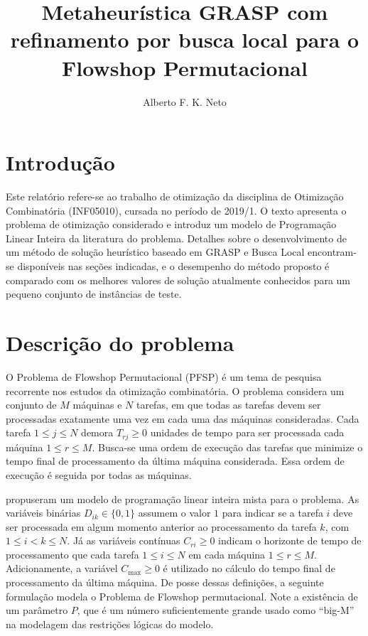\documentclass[12pt]{article}
\title{Metaheurística GRASP com refinamento por busca local para o Flowshop Permutacional}
\author{Alberto F. K. Neto\inst{1}}
\begin{document}
 

\maketitle

\section{Introdução}

Este relatório refere-se ao trabalho de otimização da disciplina de Otimização
Combinatória (INF05010), cursada no período de 2019/1. O texto apresenta o
problema de otimização considerado e introduz um modelo de Programação Linear
Inteira da literatura do problema. Detalhes sobre o desenvolvimento de um método
de solução heurístico baseado em GRASP e Busca Local encontram-se disponíveis
nas seções indicadas, e o desempenho do método proposto é comparado com os
melhores valores de solução atualmente conhecidos para um pequeno conjunto de
instâncias de teste. 

\section{Descrição do problema}

O Problema de Flowshop Permutacional (PFSP) é um tema de pesquisa recorrente
nos estudos da otimização combinatória. O problema considera um conjunto de 
$M$ máquinas e $N$ tarefas, em que todas as tarefas devem ser processadas 
exatamente uma vez em cada uma das máquinas consideradas. Cada tarefa 
$1 \leqslant j \leqslant N$ demora $T_{rj} \geqslant 0$ unidades de tempo para ser 
processada cada máquina $1 \leqslant r \leqslant M$. Busca-se uma ordem de
execução das tarefas que minimize o tempo final de processamento da última 
máquina considerada. Essa ordem de execução é seguida por todas as máquinas.

\cite{tseng2004-flowshop-models} propuseram um modelo de programação linear
inteira mista para o problema. As variáveis binárias $D_{ik} \in \{0,1\}$
assumem o valor $1$ para indicar
se a tarefa $i$ deve ser processada em algum momento anterior ao 
processamento da tarefa $k$, com $1 \leqslant i < k \leqslant N$.
Já as variáveis contínuas $C_{ri} \geqslant 0$ indicam o horizonte de tempo 
de processamento que cada tarefa $ 1 \leqslant i \leqslant N$ em cada
máquina $1 \leqslant r \leqslant M$.
Adicionamente, a variável $C_\mathrm{max} \geqslant 0$ é utilizado no
cálculo do tempo final de processamento da última máquina. 
De posse dessas definições, a seguinte formulação modela o Problema de 
Flowshop permutacional. Note a existência de um parâmetro $P$, que é um 
número suficientemente grande usado como ``big-M'' na modelagem das 
restrições lógicas do modelo.
\end{document}
